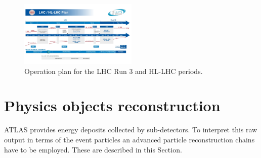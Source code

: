 \begin{figure}[htbp]
    \centering
    \includegraphics[width=0.5\textwidth]{Ch2/Img/HL-LHC-January-2021_small.jpg}
    \caption{Operation plan for the LHC Run 3 and HL-LHC periods.}
    \label{fig:chap2:Upgrad}
\end{figure}
\section{Physics objects reconstruction}
\label{chap2:Objects}
ATLAS provides energy deposits collected by sub-detectors. To interpret this raw output in terms of the event particles an advanced particle reconstruction chains have to be employed. These are described in this Section.

